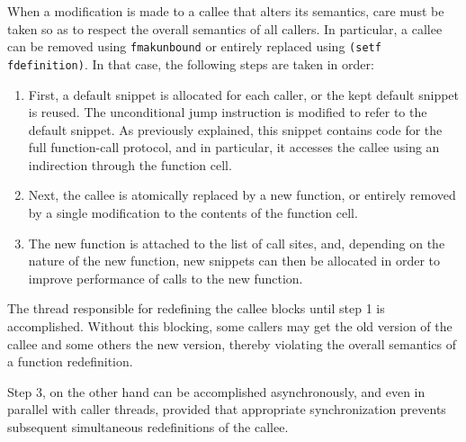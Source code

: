 When a modification is made to a callee that alters its semantics,
care must be taken so as to respect the overall semantics of all
callers.  In particular, a callee can be removed using
\texttt{fmakunbound} or entirely replaced using \texttt{(setf
  fdefinition)}.  In that case, the following steps are taken in
order:

\begin{enumerate}
\item First, a default snippet is allocated for each caller, or the
  kept default snippet is reused.  The unconditional jump instruction
  is modified to refer to the default snippet.  As previously
  explained, this snippet contains code for the full function-call
  protocol, and in particular, it accesses the callee using an
  indirection through the function cell.
\item Next, the callee is atomically replaced by a new function, or
  entirely removed by a single modification to the contents of the
  function cell.
\item The new function is attached to the list of call sites, and,
  depending on the nature of the new function, new snippets can then
  be allocated in order to improve performance of calls to the new
  function.
\end{enumerate}

The thread responsible for redefining the callee blocks until step 1
is accomplished.  Without this blocking, some callers may get the old
version of the callee and some others the new version, thereby
violating the overall semantics of a function redefinition.

Step 3, on the other hand can be accomplished asynchronously, and even
in parallel with caller threads, provided that appropriate
synchronization prevents subsequent simultaneous redefinitions of the
callee.

